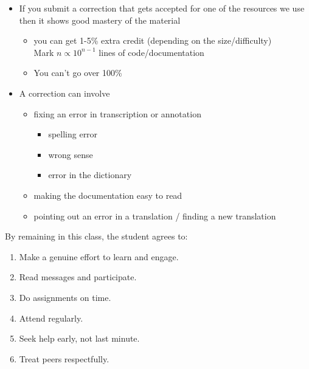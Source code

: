 \documentclass[a4paper,landscape,headrule,footrule,xetex,25pt]{foils}
\begin{document}
\begin{itemize}
\item If you submit a correction that gets accepted for one of the
  resources we use then it shows good mastery of the material
  \begin{itemize}
  \item you can get 1-5\% extra credit (depending on the size/difficulty)
\\ Mark $n \propto 10^{n-1}$ lines of code/documentation
  \item You can't go over 100\%
  \end{itemize}
\item A correction can involve
  \begin{itemize}
  \item fixing an error in transcription or annotation
    \begin{itemize}
    \item spelling error
    \item wrong sense
    \item error in the dictionary
    \end{itemize}
  \item making the documentation easy to read
  \item pointing out an error in a translation / finding a new translation
  \end{itemize}

\end{itemize}




By remaining in this class, the student agrees to:
\begin{enumerate}\addtolength{\itemsep}{-1ex}
\item  Make a genuine effort to learn and engage.
\item Read messages and participate.
\item Do assignments on time.
\item Attend regularly.
\item Seek help early, not last minute.
\item Treat peers respectfully.
\end{enumerate}
\end{document}
